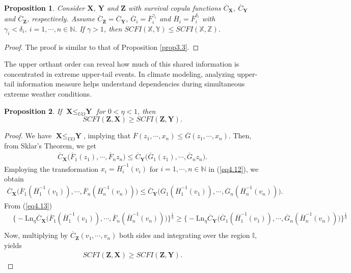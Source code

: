 \documentclass[12pt, a4paper]{article}
\numberwithin{equation}{section}
\newtheorem{proposition}{Proposition}[section]
\begin{document}
\begin{proposition}
Consider  $\textbf{X}$, $\textbf{Y}$ and $\textbf{Z}$ with survival copula functions $\overline C_\textbf{X},~\overline C_\textbf{Y}$ and $\overline C_\textbf{Z}$, respectively. Assume $\overline C_\textbf{Z}=\overline C_\textbf{Y}$, $\overline G_i=\overline F_i^{\gamma_i}$ and $\overline H_i=\overline F_i^{\delta_i}$ with $\gamma_i<\delta_i,~i=1,\cdots,n\in\mathbb{N}.$   If $\gamma>1$, then $SCFI(\mathbb{X},\mathbb{Y})\le SCFI(\mathbb{X},\mathbb{Z})$.
\end{proposition}
\begin{proof}
The proof is similar to that of Proposition \ref{prop3.3}. 
\end{proof}
The upper orthant order can reveal how much of this shared information is concentrated in extreme upper-tail events. In climate modeling, analyzing upper-tail information measure helps understand dependencies during simultaneous extreme weather conditions. 
\begin{proposition}\label{prop4.5}
If $\textbf{X}\le_{UO}\textbf{Y}$ for $0<\eta<1$, then 
 $$SCFI(\textbf{Z},\textbf{X})\ge SCFI(\textbf{Z},\textbf{Y}).$$
\end{proposition}
\begin{proof}
We have $\textbf{X}\le_{UO}\textbf{Y}$, implying that $\overline F(z_1,\cdots,x_n)\le \overline G(z_1,\cdots,x_n).$ Then, from Sklar's Theorem, we get
\begin{align}\label{eq4.12}
\overline C_\textbf{X}\big(\overline F_1(z_1),\cdots, \overline F_nz_n\big)\le \overline C_\textbf{Y}\big(\overline G_1(z_1),\cdots, \overline G_nz_n\big).
\end{align}
Employing the transformation $x_i=\overline H^{-1}_i(v_i)$ for $i=1,\cdots,n\in\mathbb{N}$ in (\ref{eq4.12}), we obtain
\begin{align}\label{eq4.13}
\overline C_\textbf{X}\big(\overline F_1(\overline H^{-1}_1(v_1)),\cdots, \overline F_n(\overline H^{-1}_n(v_n))\big)\le \overline C_\textbf{Y}\big(\overline G_1(\overline H^{-1}_1(v_1)),\cdots, \overline G_n(\overline H^{-1}_n(v_n))\big).
\end{align} From (\ref{eq4.13})
\begin{align}\label{eq4.16*}
&\Big\{-\mathrm{Ln}_\eta\overline C_\textbf{X}\big(\overline F_1(\overline H^{-1}_1(v_1)),\cdots, \overline F_n(\overline H^{-1}_n(v_n))\big)\Big\}^{\frac{1}{\eta}}\ge \Big\{-\mathrm{Ln}_\eta\overline C_\textbf{Y}\big(\overline G_1(\overline H^{-1}_1(v_1)),\cdots, \overline G_n(\overline H^{-1}_n(v_n))\big)\Big\}^{\frac{1}{\eta}}\nonumber\\
\end{align}
Now, multiplying by $\overline{C}_\textbf{Z}(v_1,\cdots,v_n)$ both sides and integrating over the region $\mathbb I$, yields
\begin{align*}
	SCFI(\textbf{Z},\textbf{X})\ge SCFI(\textbf{Z},\textbf{Y}).
\end{align*}
\end{proof}
\end{document}

